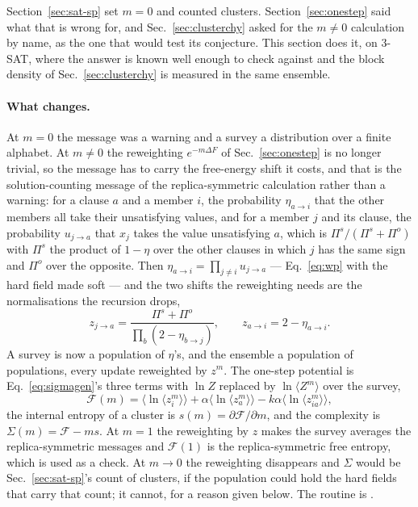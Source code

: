 Section~\ref{sec:sat-sp} set $m=0$ and counted clusters. Section~\ref{sec:onestep}
said what that is wrong for, and Sec.~\ref{sec:clusterchy} asked for the
$m\ne0$ calculation by name, as the one that would test its conjecture. This
section does it, on $3$-SAT, where the answer is known well enough to check
against \citep{krzakala2007,montanari2008} and the block density of
Sec.~\ref{sec:clusterchy} is measured in the same ensemble.

\paragraph{What changes.} At $m=0$ the message was a warning and a survey a
distribution over a finite alphabet. At $m\ne0$ the reweighting
$e^{-m\Delta F}$ of Sec.~\ref{sec:onestep} is no longer trivial, so the
message has to carry the free-energy shift it costs, and that is the
solution-counting message of the replica-symmetric calculation rather than a
warning: for a clause $a$ and a member $i$, the probability $\eta_{a\to i}$
that the other members all take their unsatisfying values, and for a member
$j$ and its clause, the probability $u_{j\to a}$ that $x_{j}$ takes the value
unsatisfying $a$, which is $\Pi^{s}/(\Pi^{s}+\Pi^{o})$ with $\Pi^{s}$ the
product of $1-\eta$ over the other clauses in which $j$ has the same sign
and $\Pi^{o}$ over the opposite. Then $\eta_{a\to i}=\prod_{j\ne i}u_{j\to a}$
--- Eq.~\eqref{eq:wp} with the hard field made soft --- and the two shifts
the reweighting needs are the normalisations the recursion drops,
\begin{equation}
  z_{j\to a}=\frac{\Pi^{s}+\Pi^{o}}{\prod_{b}(2-\eta_{b\to j})},
  \qquad
  z_{a\to i}=2-\eta_{a\to i}.
  \label{eq:satz}
\end{equation}
A survey is now a population of $\eta$'s, and the ensemble a population of
populations, every update reweighted by $z^{m}$. The one-step potential is
Eq.~\eqref{eq:sigmagen}'s three terms with $\ln Z$ replaced by
$\ln\langle Z^{m}\rangle$ over the survey,
\begin{equation}
  \mathcal{F}(m)=\bigl\langle\ln\langle z_{i}^{m}\rangle\bigr\rangle
   +\alpha\bigl\langle\ln\langle z_{a}^{m}\rangle\bigr\rangle
   -k\alpha\bigl\langle\ln\langle z_{ia}^{m}\rangle\bigr\rangle,
  \label{eq:Fm}
\end{equation}
the internal entropy of a cluster is $s(m)=\partial\mathcal{F}/\partial m$,
and the complexity is $\Sigma(m)=\mathcal{F}-ms$. At $m=1$ the reweighting
by $z$ makes the survey averages the replica-symmetric messages and
$\mathcal{F}(1)$ is the replica-symmetric free entropy, which is used as a check. At $m\to0$ the
reweighting disappears and $\Sigma$ would be Sec.~\ref{sec:sat-sp}'s count of
clusters, if the population could hold the hard fields that carry that
count; it cannot, for a reason given below.
The routine is .

